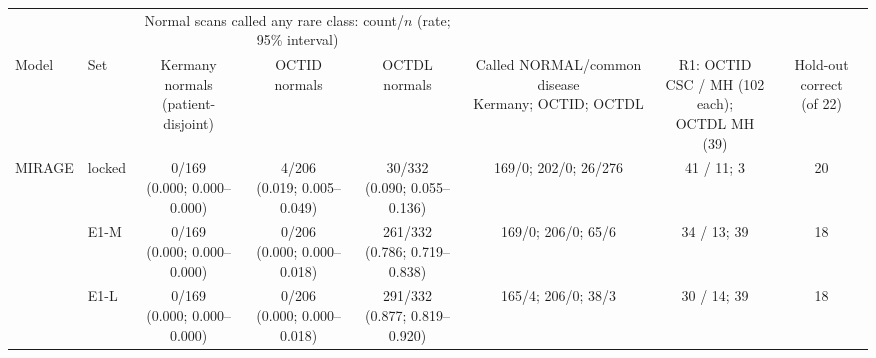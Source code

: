 \begin{tabular}{@{}llcccccc@{}}
\toprule
 & & \multicolumn{3}{c}{Normal scans called any rare class: count/$n$ (rate; 95\% interval)} & & & \\
\cmidrule(lr){3-5}
Model & Set & \makecell{Kermany normals\\(patient-disjoint)} & OCTID normals & OCTDL normals & \makecell{Called NORMAL/common disease\\Kermany; OCTID; OCTDL} & \makecell{R1: OCTID\\CSC / MH (102 each);\\OCTDL MH (39)} & \makecell{Hold-out correct\\(of 22)} \\
\midrule
MIRAGE & locked & \makecell{0/169\\{\scriptsize (0.000; 0.000--0.000)}} & \makecell{4/206\\{\scriptsize (0.019; 0.005--0.049)}} & \makecell{30/332\\{\scriptsize (0.090; 0.055--0.136)}} & 169/0; 202/0; 26/276 & 41 / 11; 3 & 20 \\
 & E1-M & \makecell{0/169\\{\scriptsize (0.000; 0.000--0.000)}} & \makecell{0/206\\{\scriptsize (0.000; 0.000--0.018)}} & \makecell{261/332\\{\scriptsize (0.786; 0.719--0.838)}} & 169/0; 206/0; 65/6 & 34 / 13; 39 & 18 \\
 & E1-L & \makecell{0/169\\{\scriptsize (0.000; 0.000--0.000)}} & \makecell{0/206\\{\scriptsize (0.000; 0.000--0.018)}} & \makecell{291/332\\{\scriptsize (0.877; 0.819--0.920)}} & 165/4; 206/0; 38/3 & 30 / 14; 39 & 18 \\

\end{tabular}
